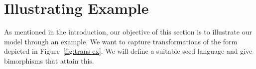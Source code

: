 
\section{Illustrating Example}\label{sec:illustratingExample}

As mentioned in the introduction, our objective of this section is to illustrate our model through an example. We want to capture transformations of the form depicted in Figure~\ref{fig:trans-ex}. We will define a suitable seed language and give bimorphisms that attain this. 

